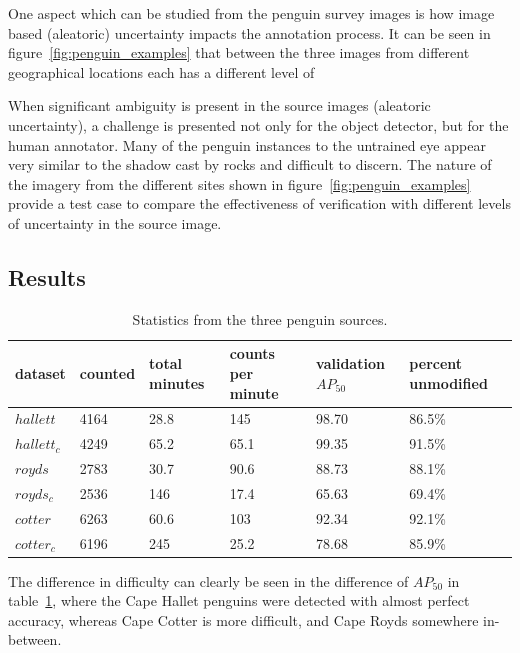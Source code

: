 One aspect which can be studied from the penguin survey images is how image based (aleatoric) uncertainty impacts the annotation process. It can be seen in figure~\ref{fig:penguin_examples} that between the three images from different geographical locations each has a different level of 

When significant ambiguity is present in the source images (aleatoric uncertainty), a challenge is presented not only for the object detector, but for the human annotator. Many of the penguin instances to the untrained eye appear very similar to the shadow cast by rocks and difficult to discern. The nature of the imagery from the different sites shown in figure~\ref{fig:penguin_examples} provide a test case to compare the effectiveness of verification with different levels of uncertainty in the source image. 


\subsection{Results}
\label{sec:penguin_results}

\begin{table}[H]
  \centering
    \caption{Statistics from the three penguin sources. }
\begin{tabular}{llllll}
dataset     & counted & total minutes & counts per minute & validation $AP_{50}$ & percent unmodified \\
\toprule
$hallett$   & 4164    & 28.8          & 145               & 98.70     & 86.5\%   \\
$hallett_c$ & 4249    & 65.2          & 65.1              & 99.35     & 91.5\%   \\
$royds$     & 2783    & 30.7          & 90.6              & 88.73     & 88.1\%   \\
$royds_c$   & 2536    & 146           & 17.4              & 65.63     & 69.4\%   \\
$cotter$    & 6263    & 60.6          & 103               & 92.34     & 92.1\%   \\
$cotter_c$  & 6196    & 245           & 25.2              & 78.68     & 85.9\%  \\
\bottomrule
\end{tabular}

\label{tab:penguin_statistics}
\end{table}

The difference in difficulty can clearly be seen in the difference of $AP_{50}$ in table~\ref{tab:penguin_statistics}, where the Cape Hallet penguins were detected with almost perfect accuracy, whereas Cape Cotter is more difficult, and Cape Royds somewhere in-between. 


